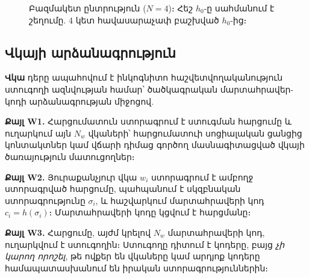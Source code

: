 \documentclass[11pt,a4paper,twocolumn]{article}
\begin{document}
\begin{figure}[ht]
\centering
{}
\caption{Բազմակետ ընտրություն ($N{=}4$)։ Հեշ $h_0$-ը սահմանում է շեղումը. 4 կետ հավասարաչափ բաշխված $h_0$-ից։}
\label{fig:multipoint}
\end{figure}

\subsection{Վկայի արձանագրություն}

\textbf{Վկա} դերը ապահովում է ինկոգնիտո հաշվետվողականություն ստուգողի ազնվության համար՝ ծածկագրական մարտահրավեր-կոդի արձանագրության միջոցով.

\textbf{Քայլ W1.} Հարցումատուն ստորագրում է ստուգման հարցումը և ուղարկում այն $N_w$ վկաների՝ հարցումատուի սոցիալական ցանցից կոնտակտներ կամ վճարի դիմաց գործող մասնագիտացված վկայի ծառայություն մատուցողներ։

\textbf{Քայլ W2.} Յուրաքանչյուր վկա $w_i$ ստորագրում է ամբողջ ստորագրված հարցումը, պահպանում է սկզբնական ստորագրությունը $\sigma_i$, և հաշվարկում մարտահրավերի կոդ $c_i = h(\sigma_i)$։ Մարտահրավերի կոդը կցվում է հարցմանը։

\textbf{Քայլ W3.} Հարցումը, այժմ կրելով $N_w$ մարտահրավերի կոդ, ուղարկվում է ստուգողին։ Ստուգողը դիտում է կոդերը, բայց \emph{չի կարող որոշել}, թե ովքեր են վկաները կամ արդյոք կոդերը համապատասխանում են իրական ստորագրություններին։
\end{document}
